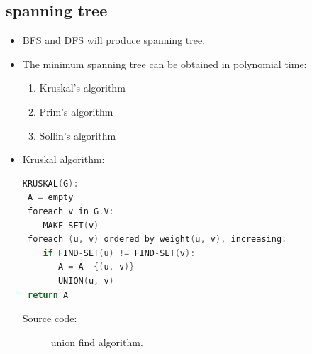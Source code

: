 \documentclass[a4paper,11pt,twoside]{book}
\begin{document}
\subsection{spanning tree}
\begin{itemize}
\item 	BFS and DFS will produce spanning tree. 
\item The minimum spanning tree can be obtained in polynomial time:
\begin{enumerate}
\item Kruskal's algorithm
\item Prim's algorithm
\item Sollin's algorithm
\end{enumerate}

\item Kruskal algorithm:
\begin{lstlisting}[frame=single, language=c++]
KRUSKAL(G):
 A = empty
 foreach v in G.V:
    MAKE-SET(v)
 foreach (u, v) ordered by weight(u, v), increasing:
    if FIND-SET(u) != FIND-SET(v):
       A = A  {(u, v)}
       UNION(u, v)
 return A
\end{lstlisting}
\begin{description}
	\item[Source code:] union find algorithm.
\end{description}

\end{itemize}
\end{document}
